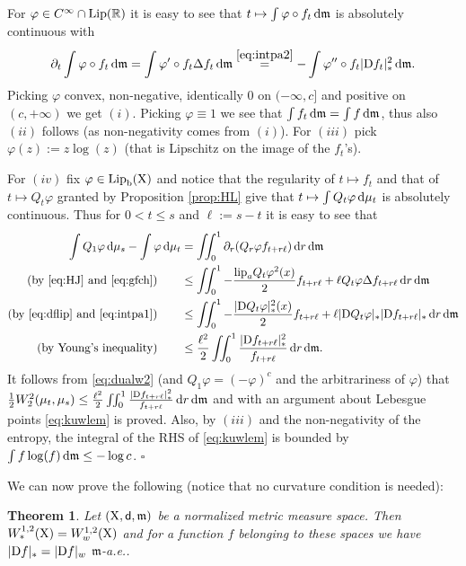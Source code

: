 \documentclass[11pt]{article}
\numberwithin{equation}{section}
\newtheorem{theorem}{Theorem}[section]
\newenvironment{idea}{\removelastskip\par\medskip   %
\noindent{\em Idea of the proof} \rm}{\penalty-20\null\hfill$\square$\par\medbreak}
\newcommand{\R}{\mathbb{R}}
\newcommand{\X}{{\rm X}}
\newcommand{\sfd}{{\sf d}}
\newcommand{\mm}{{\mathfrak m}}
\renewcommand{\d}{{\rm d}}
\newcommand{\D}{{\rm D}}
\newcommand{\Lip}{{\rm Lip}}
\newcommand{\lipa}{{\rm lip}_a}
\renewcommand{\b}{{\rm b}}
\begin{document}
\begin{idea} For $\varphi\in C^\infty\cap\Lip(\R)$ it is easy to see that $t\mapsto\int\varphi\circ f_t\,\d\mm$ is absolutely continuous with 
\[
\partial_t\int\varphi\circ f_t\,\d\mm=\int\varphi'\circ f_t\Delta f_t\,\d\mm\stackrel{\eqref{eq:intpa2}}=-\int\varphi''\circ f_t|\D f_t|^2_*\,\d\mm.
\]
Picking $\varphi$ convex, non-negative, identically $ 0$ on $(-\infty,c]$ and positive on $(c,+\infty)$ we get $(i)$. Picking $\varphi\equiv1$ we see that $\int f_t\,\d\mm=\int f\,\d\mm$, thus also $(ii)$ follows (as non-negativity comes from $(i)$). For $(iii)$ pick $\varphi(z):=z\log(z)$ (that is Lipschitz on the image of the $f_t$'s).

For $(iv)$ fix $\varphi\in\Lip_\b(\X)$ and notice that the regularity of $t\mapsto f_t$ and that of $t\mapsto Q_t\varphi$ granted by Proposition \ref{prop:HL} give that $t\mapsto \int Q_t\varphi\,\d\mu_t$ is absolutely continuous. Thus for  $0<t\leq s $ and $\ell:=s-t$   it is easy to see that
\[
\begin{split}
\int Q_1\varphi\,\d\mu_s-\int \varphi\,\d\mu_t&=\iint_0^1\partial_r (Q_r\varphi f_{t+r\ell})\,\d r\,\d\mm\\
\text{(by \eqref{eq:HJ} and \eqref{eq:gfch})}\qquad&\leq \iint_0^1-\frac{\lipa Q_t\varphi ^2(x)}2 f_{t+r\ell}+\ell Q_t\varphi \Delta f_{t+r\ell}\,\d r\,\d\mm\\
\text{(by \eqref{eq:dflip} and \eqref{eq:intpa1})}\qquad&\leq \iint_0^1-\frac{|\D Q_t\varphi |_*^2(x)}2 f_{t+r\ell}+\ell |\D Q_t\varphi|_* |\D f_{t+r\ell}|_*\,\d r\,\d\mm\\
\text{(by Young's inequality)}\qquad&\leq\frac {\ell^2}2\iint_0^1\frac{|\D f_{t+r\ell}|_*^2}{f_{t+r\ell}}\,\d r\,\d\mm.
\end{split}
\]
It follows from \eqref{eq:dualw2} (and $Q_1\varphi=(-\varphi)^c$ and the arbitrariness of $\varphi$) that $\tfrac12W_2^2(\mu_t,\mu_s)\leq  \frac{\ell^2}2\iint_0^1\frac{|\D f_{t+r\ell}|_*^2}{f_{t+r\ell}}\,\d r\,\d\mm$ and with an argument about Lebesgue points \eqref{eq:kuwlem} is proved. Also, by $(iii)$ and the non-negativity of the entropy, the integral of the RHS of \eqref{eq:kuwlem} is bounded by $\int f\log(f)\,\d\mm\leq-\log c$.
\end{idea}
We can now prove the following (notice that no curvature condition is needed):
\begin{theorem}\label{thm:sobuguali}
Let $(\X,\sfd,\mm)$ be a normalized metric measure space. Then $W^{1,2}_*(\X)=W^{1,2}_w(\X)$ and for a function $f$ belonging to these spaces we have $|\D f|_*=|\D f|_w$ $\mm$-a.e..
\end{theorem}
\end{document}

